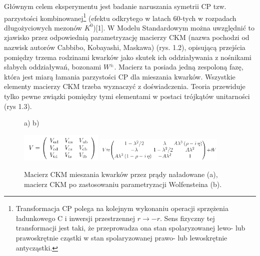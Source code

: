 \documentclass{pracamgr}
\begin{document}
Głównym celem eksperymentu jest badanie naruszania symetrii CP tzw. parzystości kombinowanej\footnote{Transformacja CP polega na kolejnym wykonaniu operacji sprzężenia ładunkowego C i inwersji przestrzennej $r \rightarrow -r$. Sens fizyczny tej transformacji jest taki, że przeprowadza ona stan spolaryzowanej lewo- lub prawoskrętnie cząstki w stan spolaryzowanej prawo- lub lewoskrętnie antycząstki.} (efektu odkrytego w latach 60-tych w rozpadach długożyciowych mezonów $K^{0}$)[1]. W Modelu Standardowym można uwzględnić to zjawisko przez odpowiednią parametryzację macierzy CKM (nazwa pochodzi od nazwisk autorów Cabbibo, Kobayashi, Maskawa) (rys. 1.2), opisującą przejścia pomiędzy trzema rodzinami kwarków jako skutek ich oddziaływania z nośnikami słabych oddziaływań, bozonami $W^{\pm}$. Macierz ta posiada jedną zespoloną fazę, która jest miarą łamania parzystości CP dla mieszania kwarków. Wszystkie elementy macierzy CKM trzeba wyznaczyć z doświadczenia. Teoria przewiduje tylko pewne związki pomiędzy tymi elementami w postaci trójkątów unitarności (rys 1.3).
\\

\begin{figure}[h!]
 \hspace{20pt}a) \hspace{160pt} b)
\begin{center}
 \includegraphics[width=0.35\textwidth]{rysunki/introduction/ckm1.png}
 \hspace{5pt}
 \includegraphics[width=0.55\textwidth]{rysunki/introduction/ckm2.png}
 \caption{Macierz CKM mieszania kwarków przez prądy naładowane (a), macierz CKM po zastosowaniu parametryzacji Wolfensteina (b).}
\end{center}
\end{figure}
\end{document}
